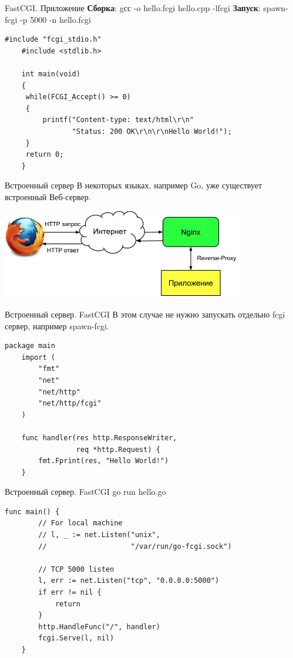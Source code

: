 \begin{frame}[fragile]{FastCGI. Приложение}
    \textbf{Сборка}: gсс -o hello.fcgi hello.cpp -lfcgi\newline
    \textbf{Запуск}: spawn-fcgi -p 5000 -n hello.fcgi

    \begin{lstlisting}[style=cpp, caption=Си]
    #include "fcgi_stdio.h"
    #include <stdlib.h>

    int main(void)
    {
     while(FCGI_Accept() >= 0)
     {
         printf("Content-type: text/html\r\n"
                "Status: 200 OK\r\n\r\nHello World!");
     }
     return 0;
    }
    \end{lstlisting}
\end{frame}

\begin{frame}{Встроенный сервер}
    В некоторых языках, например Go, уже существует встроенный
    Веб-сервер.

    \begin{center}
        \includegraphics[width=4.2in]{media/reverse_proxy.png}
    \end{center}
\end{frame}

\begin{frame}[fragile]{Встроенный сервер. FastCGI}
    В этом случае не нужно запускать отдельно fcgi сервер, например
    spawn-fcgi.

    \begin{lstlisting}[style=go, caption=Go]
    package main
    import (
        "fmt"
        "net"
        "net/http"
        "net/http/fcgi"
    )

    func handler(res http.ResponseWriter,
                 req *http.Request) {
        fmt.Fprint(res, "Hello World!")
    }
    \end{lstlisting}
\end{frame}

\begin{frame}[fragile]{Встроенный сервер. FastCGI}
    go run hello.go
    \begin{lstlisting}[style=go, caption=Go]
    func main() {
        // For local machine
        // l, _ := net.Listen("unix",
        //                    "/var/run/go-fcgi.sock")

        // TCP 5000 listen
        l, err := net.Listen("tcp", "0.0.0.0:5000")
        if err != nil {
            return
        }
        http.HandleFunc("/", handler)
        fcgi.Serve(l, nil)
    }
    \end{lstlisting}
\end{frame}

